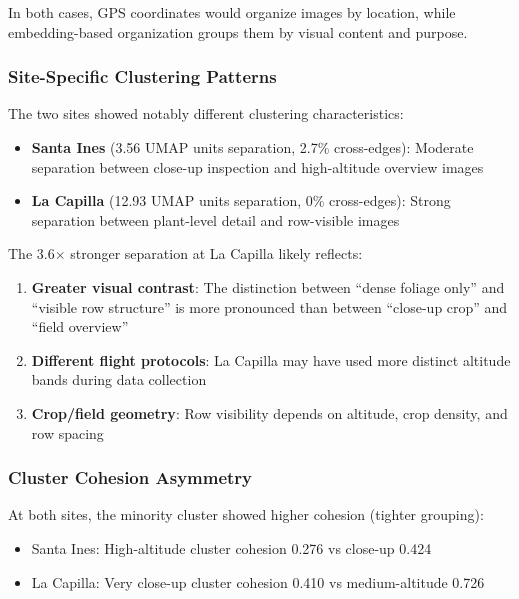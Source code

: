 In both cases, GPS coordinates would organize images by location, while embedding-based organization groups them by visual content and purpose.

\subsubsection{Site-Specific Clustering Patterns}

The two sites showed notably different clustering characteristics:

\begin{itemize}
    \item \textbf{Santa Ines} (3.56 UMAP units separation, 2.7\% cross-edges): Moderate separation between close-up inspection and high-altitude overview images
    \item \textbf{La Capilla} (12.93 UMAP units separation, 0\% cross-edges): Strong separation between plant-level detail and row-visible images
\end{itemize}

The 3.6$\times$ stronger separation at La Capilla likely reflects:
\begin{enumerate}
    \item \textbf{Greater visual contrast}: The distinction between ``dense foliage only'' and ``visible row structure'' is more pronounced than between ``close-up crop'' and ``field overview''
    \item \textbf{Different flight protocols}: La Capilla may have used more distinct altitude bands during data collection
    \item \textbf{Crop/field geometry}: Row visibility depends on altitude, crop density, and row spacing
\end{enumerate}

\subsubsection{Cluster Cohesion Asymmetry}

At both sites, the minority cluster showed higher cohesion (tighter grouping):

\begin{itemize}
    \item Santa Ines: High-altitude cluster cohesion 0.276 vs close-up 0.424
    \item La Capilla: Very close-up cluster cohesion 0.410 vs medium-altitude 0.726
\end{itemize}

